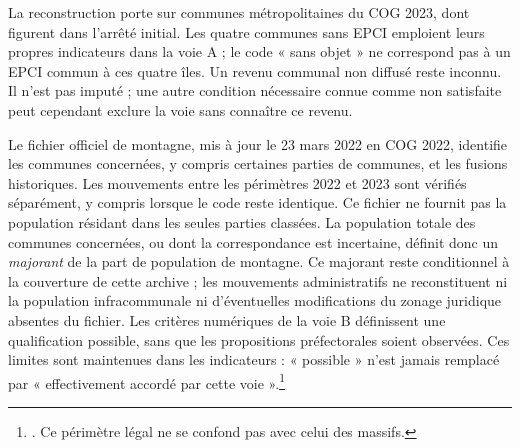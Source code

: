 \begin{table}[htbp]\centering\small\caption{Seuils reproduits pour le classement initial de 2024}\label{tab:thresholds}\end{table}

La reconstruction porte sur \AssignmentMetroN{} communes métropolitaines du COG 2023, dont \AssignmentListedN{} figurent dans l’arrêté initial. Les quatre communes sans EPCI emploient leurs propres indicateurs dans la voie A ; le code « sans objet » ne correspond pas à un EPCI commun à ces quatre îles. Un revenu communal non diffusé reste inconnu. Il n’est pas imputé ; une autre condition nécessaire connue comme non satisfaite peut cependant exclure la voie sans connaître ce revenu.

Le fichier officiel de montagne, mis à jour le 23 mars 2022 en COG 2022, identifie les communes concernées, y compris certaines parties de communes, et les fusions historiques. Les mouvements entre les périmètres 2022 et 2023 sont vérifiés séparément, y compris lorsque le code reste identique. Ce fichier ne fournit pas la population résidant dans les seules parties classées. La population totale des communes concernées, ou dont la correspondance est incertaine, définit donc un \emph{majorant} de la part de population de montagne. Ce majorant reste conditionnel à la couverture de cette archive ; les mouvements administratifs ne reconstituent ni la population infracommunale ni d’éventuelles modifications du zonage juridique absentes du fichier. Les critères numériques de la voie B définissent une qualification possible, sans que les propositions préfectorales soient observées. Ces limites sont maintenues dans les indicateurs : « possible » n’est jamais remplacé par « effectivement accordé par cette voie ».\footnote{. Ce périmètre légal ne se confond pas avec celui des massifs.}

\begin{table}[htbp]\centering\small\caption{Confrontation des voies reconstruites à la liste métropolitaine initiale}\label{tab:paths}\end{table}


